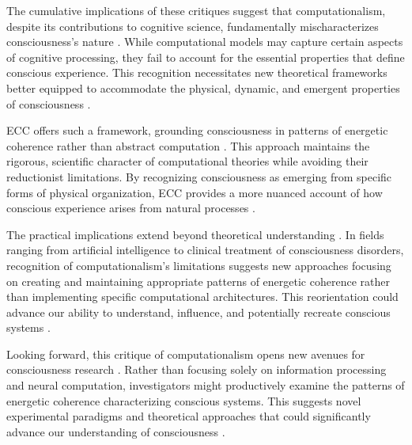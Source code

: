 The cumulative implications of these critiques suggest that computationalism, despite its contributions to cognitive science, fundamentally mischaracterizes consciousness's nature \cite{dreyfus1972what}. While computational models may capture certain aspects of cognitive processing, they fail to account for the essential properties that define conscious experience. This recognition necessitates new theoretical frameworks better equipped to accommodate the physical, dynamic, and emergent properties of consciousness \cite{wheeler2005reconstructing}.

ECC offers such a framework, grounding consciousness in patterns of energetic coherence rather than abstract computation \cite{maturana1980autopoiesis}. This approach maintains the rigorous, scientific character of computational theories while avoiding their reductionist limitations. By recognizing consciousness as emerging from specific forms of physical organization, ECC provides a more nuanced account of how conscious experience arises from natural processes \cite{searle1980minds}.

The practical implications extend beyond theoretical understanding \cite{harnad1990symbol}. In fields ranging from artificial intelligence to clinical treatment of consciousness disorders, recognition of computationalism's limitations suggests new approaches focusing on creating and maintaining appropriate patterns of energetic coherence rather than implementing specific computational architectures. This reorientation could advance our ability to understand, influence, and potentially recreate conscious systems \cite{bickhard1995foundational}.

Looking forward, this critique of computationalism opens new avenues for consciousness research \cite{van1998dynamical}. Rather than focusing solely on information processing and neural computation, investigators might productively examine the patterns of energetic coherence characterizing conscious systems. This suggests novel experimental paradigms and theoretical approaches that could significantly advance our understanding of consciousness \cite{fodor2000mind}.